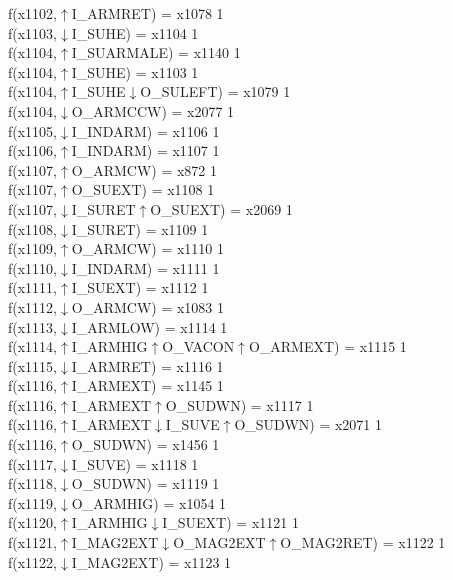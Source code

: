 f(x1102,$\uparrow$I\_ARMRET) = x1078 {1} \\
f(x1103,$\downarrow$I\_SUHE) = x1104 {1} \\
f(x1104,$\uparrow$I\_SUARMALE) = x1140 {1} \\
f(x1104,$\uparrow$I\_SUHE) = x1103 {1} \\
f(x1104,$\uparrow$I\_SUHE$\downarrow$O\_SULEFT) = x1079 {1} \\
f(x1104,$\downarrow$O\_ARMCCW) = x2077 {1} \\
f(x1105,$\downarrow$I\_INDARM) = x1106 {1} \\
f(x1106,$\uparrow$I\_INDARM) = x1107 {1} \\
f(x1107,$\uparrow$O\_ARMCW) = x872 {1} \\
f(x1107,$\uparrow$O\_SUEXT) = x1108 {1} \\
f(x1107,$\downarrow$I\_SURET$\uparrow$O\_SUEXT) = x2069 {1} \\
f(x1108,$\downarrow$I\_SURET) = x1109 {1} \\
f(x1109,$\uparrow$O\_ARMCW) = x1110 {1} \\
f(x1110,$\downarrow$I\_INDARM) = x1111 {1} \\
f(x1111,$\uparrow$I\_SUEXT) = x1112 {1} \\
f(x1112,$\downarrow$O\_ARMCW) = x1083 {1} \\
f(x1113,$\downarrow$I\_ARMLOW) = x1114 {1} \\
f(x1114,$\uparrow$I\_ARMHIG$\uparrow$O\_VACON$\uparrow$O\_ARMEXT) = x1115 {1} \\
f(x1115,$\downarrow$I\_ARMRET) = x1116 {1} \\
f(x1116,$\uparrow$I\_ARMEXT) = x1145 {1} \\
f(x1116,$\uparrow$I\_ARMEXT$\uparrow$O\_SUDWN) = x1117 {1} \\
f(x1116,$\uparrow$I\_ARMEXT$\downarrow$I\_SUVE$\uparrow$O\_SUDWN) = x2071 {1} \\
f(x1116,$\uparrow$O\_SUDWN) = x1456 {1} \\
f(x1117,$\downarrow$I\_SUVE) = x1118 {1} \\
f(x1118,$\downarrow$O\_SUDWN) = x1119 {1} \\
f(x1119,$\downarrow$O\_ARMHIG) = x1054 {1} \\
f(x1120,$\uparrow$I\_ARMHIG$\downarrow$I\_SUEXT) = x1121 {1} \\
f(x1121,$\uparrow$I\_MAG2EXT$\downarrow$O\_MAG2EXT$\uparrow$O\_MAG2RET) = x1122 {1} \\
f(x1122,$\downarrow$I\_MAG2EXT) = x1123 {1} \\
